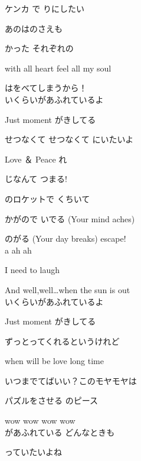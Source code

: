 {ケンカ で りにしたい

あのはのさえも

かった それぞれの

with all heart feel all my soul

はをべてしまうから！
\\

いくらいがあふれているよ

Just moment  がきしてる

せつなくて せつなくて にいたいよ

Love ＆ Peace れ

じなんて つまる!

のロケットで くちいて

かがので いでる (Your mind aches)

のがる (Your day breaks) escape!
\\

a ah ah

I need to laugh

And well,well…when the sun is out
\\

いくらいがあふれているよ

Just moment  がきしてる

ずっとってくれるというけれど

when will be love long time

いつまでてばいい？このモヤモヤは

パズルをさせる のピース

wow wow wow wow
\\

があふれている どんなときも

っていたいよね

}